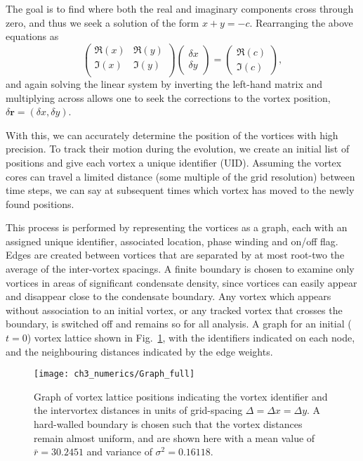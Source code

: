The goal is to find where both the real and imaginary components cross through zero, and thus we seek a solution of the form $x + y = -c$. Rearranging the above equations as
\begin{equation}\left(
    \begin{array}{cc}
        \Re(x) & \Re(y) \\
        \Im(x) & \Im(y) \\
    \end{array}\right)
    \left(
    \begin{array}{c}
        \delta x \\
        \delta y
    \end{array}\right)
    =
    \left(
    \begin{array}{c}
        \Re(c) \\
        \Im(c)
    \end{array}\right),
\end{equation}
and again solving the linear system by inverting the left-hand matrix and multiplying across allows one to seek the corrections to the vortex position, $\delta \mathbf{r} = (\delta x, \delta y )$.

 With this, we can accurately determine the position of the vortices with high precision. To track their motion during the evolution, we create an initial list of positions and give each vortex a unique identifier (UID). Assuming the vortex cores can travel a limited distance (some multiple of the grid resolution) between time steps, we can say at subsequent times which vortex has moved to the newly found positions.

 This process is performed by representing the vortices as a graph, each with an assigned unique identifier, associated location, phase winding and on/off flag. Edges are created between vortices that are separated by at most root-two the average of the inter-vortex spacings. A finite boundary is chosen to examine only vortices in areas of significant condensate density, since vortices can easily appear and disappear close to the condensate boundary. Any vortex which appears without association to an initial vortex, or any tracked vortex that crosses the boundary, is switched off and remains so for all analysis. A graph for an initial ($t=0$) vortex lattice shown in Fig.~\ref{fig:graphit}, with the identifiers indicated on each node, and the neighbouring distances indicated by the edge weights. %

 \begin{figure}
     \centering
     \texttt{[image: ch3\_numerics/Graph\_full]}
     \caption{Graph of vortex lattice positions indicating the vortex identifier and the intervortex distances in units of grid-spacing $\Delta= \Delta x = \Delta y$. A hard-walled boundary is chosen such that the vortex distances remain almost uniform, and are shown here with a mean value of $\bar{r} = 30.2451$ and variance of $\sigma^2 = 0.16118$.}
     \label{fig:graphit}
 \end{figure}
